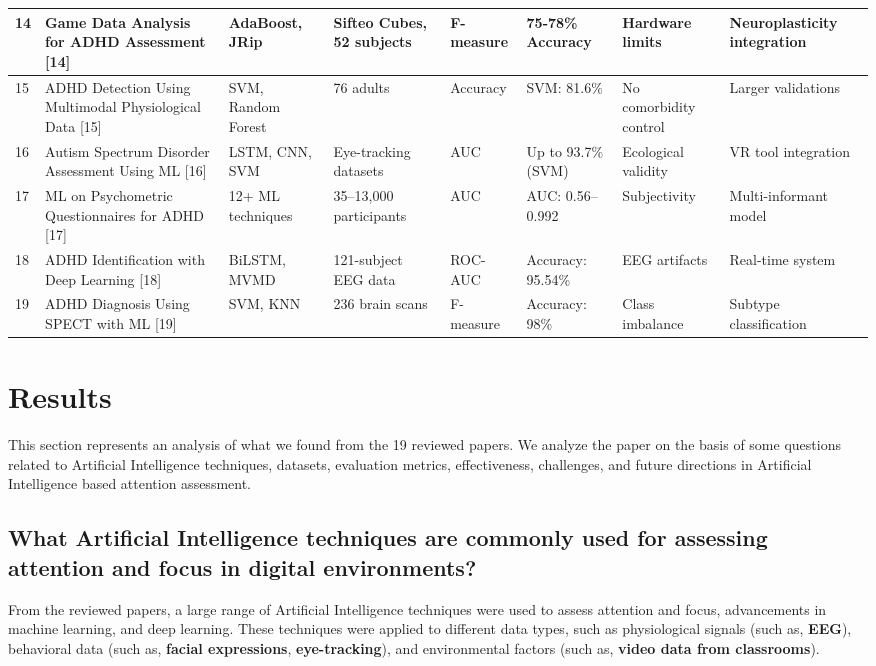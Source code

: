 \documentclass[12pt]{article}
\begin{document}
\begin{longtable}{|p{}|p{}|p{}|p{}|p{}|p{}|p{}|p{}|}
\hline
14 & Game Data Analysis for ADHD Assessment [14] & AdaBoost, JRip & Sifteo Cubes, 52 subjects & F-measure & 75-78\% Accuracy & Hardware limits & Neuroplasticity integration \\
\hline
15 & ADHD Detection Using Multimodal Physiological Data [15] & SVM, Random Forest & 76 adults & Accuracy & SVM: 81.6\% & No comorbidity control & Larger validations \\
\hline
16 & Autism Spectrum Disorder Assessment Using ML [16] & LSTM, CNN, SVM & Eye-tracking datasets & AUC & Up to 93.7\% (SVM) & Ecological validity & VR tool integration \\
\hline
17 & ML on Psychometric Questionnaires for ADHD [17] & 12+ ML techniques & 35–13,000 participants & AUC & AUC: 0.56–0.992 & Subjectivity & Multi-informant model \\
\hline
18 & ADHD Identification with Deep Learning [18] & BiLSTM, MVMD & 121-subject EEG data & ROC-AUC & Accuracy: 95.54\% & EEG artifacts & Real-time system \\
\hline
19 & ADHD Diagnosis Using SPECT with ML [19] & SVM, KNN & 236 brain scans & F-measure & Accuracy: 98\% & Class imbalance & Subtype classification \\
\hline
\end{longtable}

\section{Results}
This section represents an analysis of what we found from the 19 reviewed papers. We analyze the paper on the basis of some questions related to Artificial Intelligence techniques, datasets, evaluation metrics, effectiveness, challenges, and future directions in Artificial Intelligence based attention assessment.

\subsection{What Artificial Intelligence techniques are commonly used for assessing attention and focus in digital environments?}
From the reviewed papers, a large range of Artificial Intelligence techniques were used to assess attention and focus, advancements in machine learning, and deep learning. These techniques were applied to different data types, such as physiological signals (such as, \textbf{EEG}), behavioral data (such as, \textbf{facial expressions}, \textbf{eye-tracking}), and environmental factors (such as, \textbf{video data from classrooms}).
\end{document}
